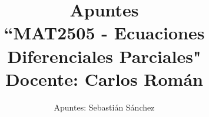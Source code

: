 

\usepackage{subfiles}

\title{
Apuntes \\
``MAT2505 - Ecuaciones Diferenciales Parciales"\\
{\normalsize Docente: Carlos Román}}
\author{\normalsize Apuntes: Sebastián Sánchez}
\date{}



\maketitle

\tableofcontents


























